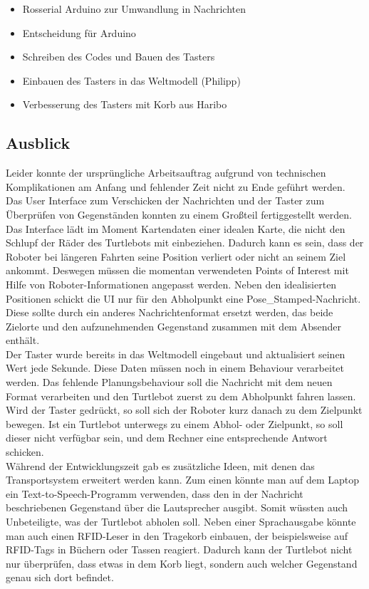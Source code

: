 \documentclass[a4paper,12pt,headsepline]{scrartcl}
\begin{document}
		\begin{itemize}
			\item Rosserial Arduino zur Umwandlung in Nachrichten
			\item Entscheidung für Arduino
			\item Schreiben des Codes und Bauen des Tasters
			\item Einbauen des Tasters in das Weltmodell (Philipp)
			\item Verbesserung des Tasters mit Korb aus Haribo
		\end{itemize}
	
	\subsection{Ausblick}
		Leider konnte der ursprüngliche Arbeitsauftrag aufgrund von technischen Komplikationen am Anfang und fehlender Zeit nicht zu Ende geführt werden. Das User Interface zum Verschicken der Nachrichten und der Taster zum Überprüfen von Gegenständen konnten zu einem Großteil fertiggestellt werden.\\
		Das Interface lädt im Moment Kartendaten einer idealen Karte, die nicht den Schlupf der Räder des Turtlebots mit einbeziehen. Dadurch kann es sein, dass der Roboter bei längeren Fahrten seine Position verliert oder nicht an seinem Ziel ankommt. Deswegen müssen die momentan verwendeten Points of Interest mit Hilfe von Roboter-Informationen angepasst werden. Neben den idealisierten Positionen schickt die UI nur für den Abholpunkt eine \glqq Pose{\_}Stamped\grqq-Nachricht. Diese sollte durch ein anderes Nachrichtenformat ersetzt werden, das beide Zielorte und den aufzunehmenden Gegenstand zusammen mit dem Absender enthält.\\
		Der Taster wurde bereits in das Weltmodell eingebaut und aktualisiert seinen Wert jede Sekunde. Diese Daten müssen noch in einem Behaviour verarbeitet werden. Das fehlende Planungsbehaviour soll die Nachricht mit dem neuen Format verarbeiten und den Turtlebot zuerst zu dem Abholpunkt fahren lassen. Wird der Taster gedrückt, so soll sich der Roboter kurz danach zu dem Zielpunkt bewegen. Ist ein Turtlebot unterwegs zu einem Abhol- oder Zielpunkt, so soll dieser nicht verfügbar sein, und dem Rechner eine entsprechende Antwort schicken.\\
		Während der Entwicklungszeit gab es zusätzliche Ideen, mit denen das Transportsystem erweitert werden kann. Zum einen könnte man auf dem Laptop ein Text-to-Speech-Programm verwenden, dass den in der Nachricht beschriebenen Gegenstand über die Lautsprecher ausgibt. Somit wüssten auch Unbeteiligte, was der Turtlebot abholen soll. Neben einer Sprachausgabe könnte man auch einen RFID-Leser in den Tragekorb einbauen, der beispielsweise auf RFID-Tags in Büchern oder Tassen reagiert. Dadurch kann der Turtlebot nicht nur überprüfen, dass etwas in dem Korb liegt, sondern auch welcher Gegenstand genau sich dort befindet.
		
\end{document}
